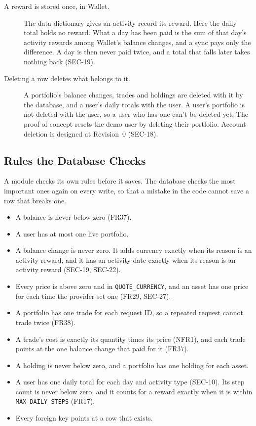 \documentclass[12pt, titlepage]{article}
\begin{document}
\begin{description}
\item[A reward is stored once, in Wallet.] The data dictionary gives an
  activity record its reward. Here the daily total holds no reward. What a day
  has been paid is the sum of that day's activity rewards among Wallet's
  balance changes, and a sync pays only the difference. A day is then never
  paid twice, and a total that falls later takes nothing back (SEC-19).

\item[Deleting a row deletes what belongs to it.] A portfolio's balance
  changes, trades and holdings are deleted with it by the database, and a
  user's daily totals with the user. A user's portfolio is not deleted with the
  user, so a user who has one can't be deleted yet. The proof of concept resets
  the demo user by deleting their portfolio. Account deletion is designed at
  Revision~0 (SEC-18).
\end{description}

\subsection{Rules the Database Checks}

A module checks its own rules before it saves. The database checks the most
important ones again on every write, so that a mistake in the code cannot save
a row that breaks one.

\begin{itemize}
\item A balance is never below zero (FR37).
\item A user has at most one live portfolio.
\item A balance change is never zero. It adds currency exactly when its reason
  is an activity reward, and it has an activity date exactly when its reason is
  an activity reward (SEC-19, SEC-22).
\item Every price is above zero and in \texttt{QUOTE\_CURRENCY}, and an asset
  has one price for each time the provider set one (FR29, SEC-27).
\item A portfolio has one trade for each request ID, so a repeated request
  cannot trade twice (FR38).
\item A trade's cost is exactly its quantity times its price (NFR1), and each
  trade points at the one balance change that paid for it (FR37).
\item A holding is never below zero, and a portfolio has one holding for each
  asset.
\item A user has one daily total for each day and activity type (SEC-10). Its
  step count is never below zero, and it counts for a reward exactly when it
  is within \texttt{MAX\_DAILY\_STEPS} (FR17).
\item Every foreign key points at a row that exists.
\end{itemize}
\end{document}
